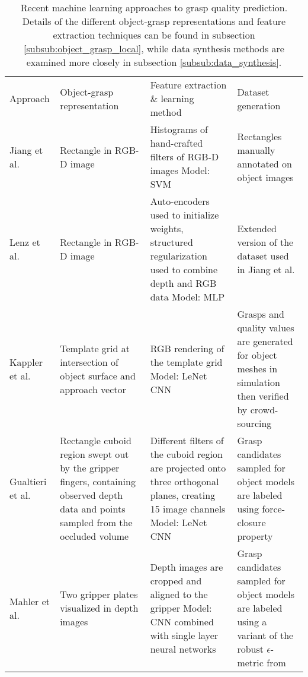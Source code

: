 \begin{table}[h!]
    \small
    \begin{tabularx}{\textwidth}{L{0.12\textwidth}L{0.26\textwidth}L{0.33\textwidth}L{0.26\textwidth}}
        \cmidrule[0.08em](){1-4}
        Approach                              & Object-grasp representation & Feature extraction \& learning method
        & Dataset generation
        \\ \cmidrule[0.08em](){1-4}
        Jiang et al. \cite{jiang2011}         & Rectangle in RGB-D image
        & Histograms of hand-crafted filters of RGB-D images
        \linebreak Model: SVM
        & Rectangles manually annotated on object images
        \\ \cmidrule[0.01em](){1-4}
        Lenz et al. \cite{lenz2015}           & Rectangle in RGB-D image
        & Auto-encoders used to initialize weights, structured regularization used
        to combine depth and RGB data
        \linebreak Model: MLP
        & Extended version of the dataset used in Jiang et al. \cite{jiang2011}
        \\ \cmidrule[0.01em](){1-4}
        Kappler et al. \cite{Kappler2015}     & Template grid at intersection of object surface and approach vector
        & RGB rendering of the template grid
        \linebreak Model: LeNet CNN
        & Grasps and quality values are generated for object meshes in simulation
        then verified by crowd- sourcing
        \\ \cmidrule[0.01em](){1-4}
        Gualtieri et al. \cite{Gualtieri2016} & Rectangle cuboid region swept out by the gripper fingers, containing
        observed depth data and points sampled from the occluded volume
        & Different filters of the cuboid region are projected onto three orthogonal
        planes, creating 15 image channels
        \linebreak Model: LeNet CNN
        & Grasp candidates sampled for object models are labeled using force-closure
        property
        \\ \cmidrule[0.01em](){1-4}
        Mahler et al. \cite{mahler2017}       & Two gripper plates visualized in depth images
        & Depth images are cropped and aligned to the gripper
        \linebreak Model: CNN combined with single layer neural networks
        & Grasp candidates sampled for object models are labeled using a variant
        of the robust $ \epsilon $-metric from \cite{WeiszAllen2012}
        \\ \cmidrule[0.08em](){1-4}
    \end{tabularx}
    \caption{\small Recent machine learning approaches to grasp quality prediction. Details of the different
        object-grasp representations and feature extraction techniques can be found in subsection
        \ref{subsub:object_grasp_local}, while data synthesis methods are examined more closely in subsection
        \ref{subsub:data_synthesis}.}
    \label{table:grasp_quality_approaches}
\end{table}

